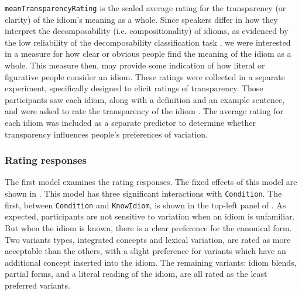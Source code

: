 \documentclass[output=paper
,modfonts
,nonflat]{langsci/langscibook}
\begin{document}
\texttt{meanTransparencyRating} is the scaled average rating for the transparency (or clarity) of the idiom's meaning as a whole. Since speakers differ in how they interpret the decomposability (i.e. compositionality) of idioms, as evidenced by the low reliability of the decomposability classification task \citep{TitoneConnine1994, TabossiEtAl2008}, we were interested in a measure for how clear or obvious people find the meaning of the idiom as a whole. This measure then, may provide some indication of how literal or figurative people consider an idiom. These ratings were collected in a separate experiment, specifically designed to elicit ratings of transparency. Those participants saw each idiom, along with a definition and an example sentence, and were asked to rate the transparency of the idiom \citep[for further details, see][]{Geeraert2016}. The average rating for each idiom was included as a separate predictor to determine whether transparency influences people's preferences of variation.

\subsubsection{Rating responses}

The first model examines the rating responses. The fixed effects of this model are shown in . This model has three significant interactions with \texttt{Condition}. The first, between \texttt{Condition} and \texttt{KnowIdiom}, is shown in the top-left panel of . As expected, participants are not sensitive to variation when an idiom is unfamiliar. But when the idiom is known, there is a clear preference for the canonical form. Two variants types, integrated concepts and lexical variation, are rated as more acceptable than the others, with a slight preference for variants which have an additional concept inserted into the idiom. The remaining variants: idiom blends, partial forms, and a literal reading of the idiom, are all rated as the least preferred variants.
\end{document}
